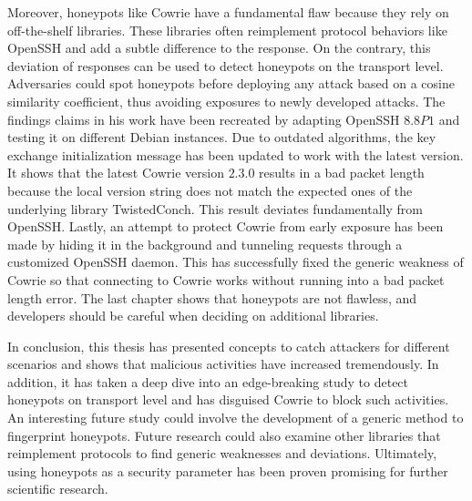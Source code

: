Moreover, honeypots like Cowrie have a fundamental flaw because they rely on off-the-shelf libraries.
These libraries often reimplement protocol behaviors like OpenSSH and add a subtle difference to the response.
On the contrary, this deviation of responses can be used to detect honeypots on the transport level.
Adversaries could spot honeypots before deploying any attack based on a cosine similarity coefficient, thus avoiding exposures to newly developed attacks.
The findings \citet{vetterl2020} claims in his work have been recreated by adapting OpenSSH $8.8P1$ and testing it on different Debian instances.
Due to outdated algorithms, the key exchange initialization message has been updated to work with the latest version.
It shows that the latest Cowrie version $2.3.0$ results in a bad packet length because the local version string does not match the expected ones of the underlying library TwistedConch.
This result deviates fundamentally from OpenSSH.
Lastly, an attempt to protect Cowrie from early exposure has been made by hiding it in the background and tunneling requests through a customized OpenSSH daemon.
This has successfully fixed the generic weakness of Cowrie so that connecting to Cowrie works without running into a bad packet length error.
The last chapter shows that honeypots are not flawless, and developers should be careful when deciding on additional libraries.

In conclusion, this thesis has presented concepts to catch attackers for different scenarios and shows that malicious activities have increased tremendously.
In addition, it has taken a deep dive into an edge-breaking study to detect honeypots on transport level and has disguised Cowrie to block such activities.
An interesting future study could involve the development of a generic method to fingerprint honeypots.
Future research could also examine other libraries that reimplement protocols to find generic weaknesses and deviations.
Ultimately, using honeypots as a security parameter has been proven promising for further scientific research.
